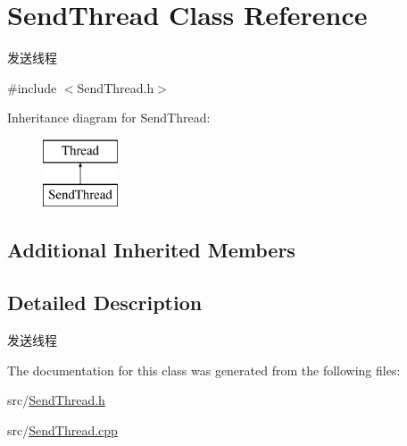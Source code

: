 \hypertarget{class_send_thread}{}\section{Send\+Thread Class Reference}
\label{class_send_thread}


发送线程  




{\ttfamily \#include $<$Send\+Thread.\+h$>$}

Inheritance diagram for Send\+Thread\+:\begin{figure}[H]
\begin{center}
\leavevmode
\includegraphics[height=2.000000cm]{class_send_thread}
\end{center}
\end{figure}
\subsection*{Additional Inherited Members}


\subsection{Detailed Description}
发送线程 

The documentation for this class was generated from the following files\+:\begin{DoxyCompactItemize}
\item 
src/\hyperlink{_send_thread_8h}{Send\+Thread.\+h}\item 
src/\hyperlink{_send_thread_8cpp}{Send\+Thread.\+cpp}\end{DoxyCompactItemize}
